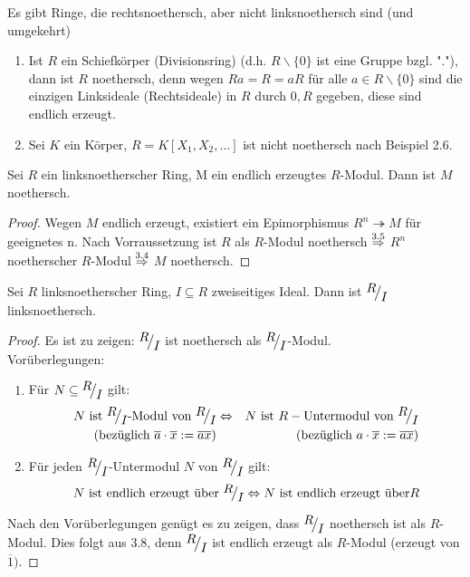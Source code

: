 \begin{anm}
	Es gibt Ringe, die rechtsnoethersch, aber nicht linksnoethersch sind (und umgekehrt)
\end{anm}
\begin{bsp}
	\begin{enumerate} [label=\alph*)]
		\item Ist $R$ ein Schiefkörper (Divisionsring) (d.h. $R \backslash \{0\}$ ist eine Gruppe bzgl. "."), dann ist $R$ noethersch, denn wegen $Ra=R=aR$ für alle $ a \in R \backslash \{0\}$ sind die einzigen Linksideale (Rechtsideale) in $R$ durch $0,R$ gegeben, diese sind endlich erzeugt.
		\item Sei $K$ ein Körper, $ R= K [ X_1,X_2,\dots ]$ ist nicht noethersch nach Beispiel 2.6.
	\end{enumerate}
\end{bsp}
\begin{bem}
	Sei $R$ ein linksnoetherscher Ring, M ein endlich erzeugtes $R$-Modul. Dann ist $M$ noethersch. 
\end{bem}
\begin{proof}
	Wegen $M$ endlich erzeugt, existiert ein Epimorphismus $R^n \twoheadrightarrow M $ für geeignetes n. Nach Vorraussetzung ist $R$ als $R$-Modul noethersch $\overset{3.5}{\Rightarrow} $ $R^n $ noetherscher $R$-Modul $\overset{3.4}{\Rightarrow}$ $M$ noethersch.
\end{proof}
\begin{bem}
	Sei $R$ linksnoetherscher Ring, $I \subseteq R $ zweiseitiges Ideal. Dann ist $\QR{R}{I} $ linksnoethersch.
\end{bem}
\begin{proof}
	Es ist zu zeigen: $\QR{R}{I} $ ist noethersch als $\QR{R}{I} $-Modul. \\
	Vorüberlegungen:
	\begin{enumerate}
		\item Für $N \subseteq \QR{R}{I}$ gilt:
		\begin{eqnarray*}
		N \text{ ist } \QR{R}{I} \text{-Modul von } \QR{R}{I}& \Lra & N \text{ ist } R- \text{Untermodul von } \QR{R}{I}\\
		(\text{bezüglich } \overline{a} \cdot \overline{x}:= \overline{ax}) & & (\text{bezüglich }a \cdot \overline{x} := \overline{ax})
		\end{eqnarray*}
		\item Für jeden $\QR{R}{I} $-Untermodul $N$ von $\QR{R}{I} $ gilt:
		$$ N \text{ ist endlich erzeugt über } \QR{R}{I} \Lra N \text{ ist endlich erzeugt über} R $$ 
	\end{enumerate}
	Nach den Vorüberlegungen genügt es zu zeigen, dass $\QR{R}{I}$ noethersch ist als $R$-Modul. Dies folgt aus 3.8, denn $\QR{R}{I}$ ist endlich erzeugt als $R$-Modul (erzeugt von $\overline{1}).$
\end{proof}

